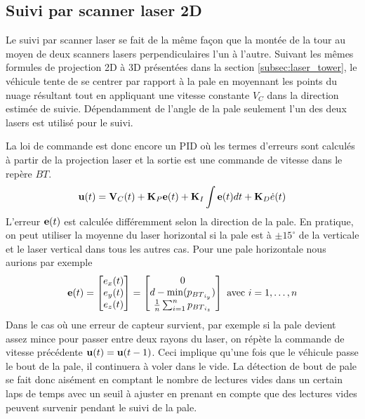 \subsection{Suivi par scanner laser 2D}
\label{subsec:laser_blade}

Le suivi par scanner laser se fait de la même façon que la montée de la tour au moyen de deux scanners lasers perpendiculaires l'un à l'autre. Suivant les mêmes formules de projection 2D à 3D présentées dans la section \ref{subsec:laser_tower}, le véhicule tente de se centrer par rapport à la pale en moyennant les points du nuage résultant tout en appliquant une vitesse constante $V_C$ dans la direction estimée de suivie. Dépendamment de l'angle de la pale seulement l'un des deux lasers est utilisé pour le suivi.

La loi de commande est donc encore un PID où les termes d'erreurs sont calculés à partir de la projection laser et la sortie est une commande de vitesse dans le repère ${BT}$.
\begin{align}
  \mathbf{u}(t) = \mathbf{V}_C(t) + \mathbf{K}_P \mathbf{e}(t) + \mathbf{K}_I\int{\mathbf{e}(t)dt} + \mathbf{K}_D\dot{e}(t)
  \label{eq:pid_laser_blade}
\end{align}
L'erreur $\mathbf{e}(t)$ est calculée différemment selon la direction de la pale. En pratique, on peut utiliser la moyenne du laser horizontal si la pale est à $\pm15^{\circ}$ de la verticale et le laser vertical dans tous les autres cas. Pour une pale horizontale nous aurions par exemple
\[
\mathbf{e}(t) = \begin{bmatrix}e_x(t) \\ e_y(t) \\ e_z(t)\end{bmatrix} =
\begin{bmatrix}
0 \\ d - \min(p_{{BT}_{i_y}}) \\ \frac{1}{n}\sum_{i=1}^{n}p_{{BT}_{i_z}}
\end{bmatrix} \text{ avec } i=1,\ldots,n
\]
Dans le cas où une erreur de capteur survient, par exemple si la pale devient assez mince pour passer entre deux rayons du laser, on répète la commande de vitesse précédente $\mathbf{u}(t) = \mathbf{u}(t-1)$. Ceci implique qu'une fois que le véhicule passe le bout de la pale, il continuera à voler dans le vide. La détection de bout de pale se fait donc aisément en comptant le nombre de lectures vides dans un certain laps de temps avec un seuil à ajuster en prenant en compte que des lectures vides peuvent survenir pendant le suivi de la pale.

